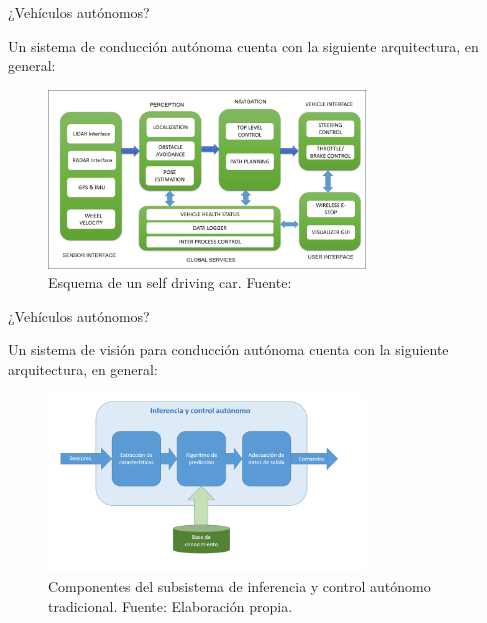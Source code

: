 \documentclass[10pt]{beamer}
\begin{document}
\begin{frame}[fragile]{¿Vehículos autónomos?}

    Un sistema de conducción autónoma cuenta con la siguiente arquitectura, en general:
    \begin{figure}[!h] 
      \centering
      \includegraphics[width=0.75\textwidth]{../img/selfblock}
      \caption[Esquema de un self driving car]{Esquema de un self driving car. Fuente: \cite{rosprojects}}
\end{figure}
\end{frame}

\begin{frame}[fragile]{¿Vehículos autónomos?}

  Un \alert{sistema de visión} para conducción autónoma cuenta con la siguiente arquitectura, en general:
  \begin{figure}[!h] 
    \centering
    \includegraphics[width=0.75\textwidth]{../img/inferencia}
    \caption[Inferencia y control autónomo tradicional]{Componentes del subsistema de inferencia y control autónomo tradicional. Fuente: Elaboración propia.}
\end{figure}

\end{frame}
\end{document}
